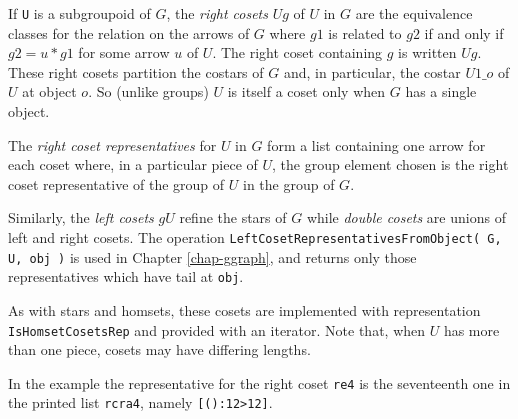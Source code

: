 \documentclass[a4paper,11pt]{report}
\begin{document}
{{{ If \texttt{U} is a subgroupoid of $G$, the \emph{right cosets} $Ug$ of $U$ in $G$ are the equivalence classes for the relation on the arrows of $G$ where $g1$ is related to $g2$ if and only if $g2 = u*g1$ for some arrow $u$ of $U$. The right coset containing $g$ is written $Ug$. These right cosets partition the costars of $G$ and, in particular, the costar $U1\_{o}$ of $U$ at object $o$. So (unlike groups) $U$ is itself a coset only when $G$ has a single object. 

 The \emph{right coset representatives} for $U$ in $G$ form a list containing one arrow for each coset where, in a particular piece
of $U$, the group element chosen is the right coset representative of the group of $U$ in the group of $G$. 

 Similarly, the \emph{left cosets} $gU$ refine the stars of $G$ while \emph{double cosets} are unions of left and right cosets. The operation \texttt{LeftCosetRepresentativesFromObject( G, U, obj )} is used in Chapter \ref{chap-ggraph}, and returns only those representatives which have tail at \texttt{obj}. 

 As with stars and homsets, these cosets are implemented with representation \texttt{IsHomsetCosetsRep} and provided with an iterator. Note that, when $U$ has more than one piece, cosets may have differing lengths. 

 In the example the representative for the right coset \texttt{re4} is the seventeenth one in the printed list \texttt{rcra4}, namely \texttt{[():\texttt{}12\texttt{}{\textgreater}\texttt{}12]}. 

 }

 
\begin{Verbatim}[commandchars=!@|,fontsize=\small,frame=single,label=Example]
  

\end{Verbatim}}}
\end{document}
